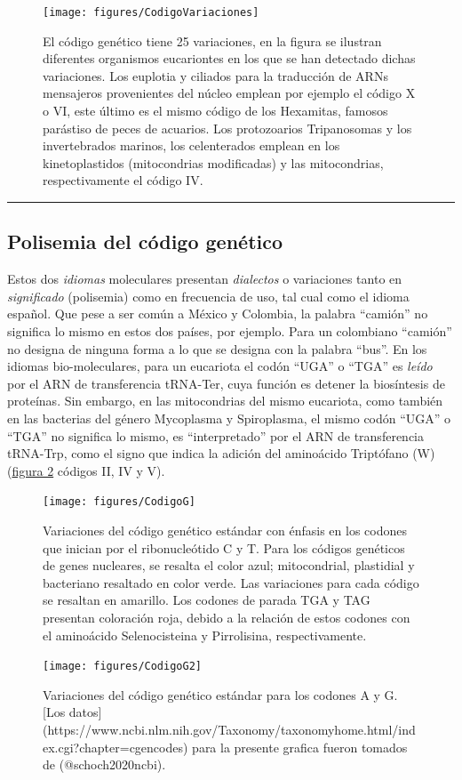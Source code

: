 \documentclass[
  12pt, krantz2,
  spanish,
]{krantz}
\begin{document}
\begin{figure}
\texttt{[image: figures/CodigoVariaciones]} \caption{El código genético tiene 25 variaciones, en la figura se ilustran diferentes organismos eucariontes en los que se han detectado dichas variaciones. Los euplotia y ciliados para la traducción de ARNs mensajeros provenientes del núcleo emplean por ejemplo el código X o VI, este último es el mismo código de los Hexamitas, famosos parástiso de peces de acuarios. Los protozoarios Tripanosomas y los invertebrados marinos, los celenterados emplean en los kinetoplastidos (mitocondrias modificadas) y las mitocondrias, respectivamente el código IV.}\label{fig:excepciones}
\end{figure}

\begin{center}\rule{0.5\linewidth}{0.5pt}\end{center}

\hypertarget{polisemia-del-cuxf3digo-genuxe9tico}{%
\subsection{Polisemia del código genético}\label{polisemia-del-cuxf3digo-genuxe9tico}}

Estos dos \emph{idiomas} moleculares presentan \emph{dialectos} o variaciones tanto en \emph{significado} (polisemia) como en frecuencia de uso, tal cual como el idioma español. Que pese a ser común a México y Colombia, la palabra ``camión'' no significa lo mismo en estos dos países, por ejemplo. Para un colombiano ``camión'' no designa de ninguna forma a lo que se designa con la palabra ``bus''. En los idiomas bio-moleculares, para un eucariota el codón ``UGA'' o ``TGA'' es \emph{leído} por el ARN de transferencia tRNA-Ter, cuya función es detener la biosíntesis de proteínas. Sin embargo, en las mitocondrias del mismo eucariota, como también en las bacterias del género Mycoplasma y Spiroplasma, el mismo codón ``UGA'' o ``TGA'' no significa lo mismo, es ``interpretado'' por el ARN de transferencia tRNA-Trp, como el signo que indica la adición del aminoácido Triptófano (W) (\href{variaciones1}{figura 2} códigos II, IV y V).

\begin{figure}
\texttt{[image: figures/CodigoG]} \caption{Variaciones del código genético estándar con énfasis en los codones que inician por el ribonucleótido C y T. Para los códigos genéticos de genes nucleares, se resalta el color azul; mitocondrial, plastidial y bacteriano resaltado en color verde. Las variaciones para cada código se resaltan en amarillo. Los codones de parada TGA y TAG  presentan coloración roja, debido a la relación de estos codones con el aminoácido Selenocisteina y Pirrolisina, respectivamente.}\label{fig:variaciones1-1}
\end{figure}
\begin{figure}
\texttt{[image: figures/CodigoG2]} \caption{Variaciones del código genético estándar para los codones A y G. [Los datos](https://www.ncbi.nlm.nih.gov/Taxonomy/taxonomyhome.html/index.cgi?chapter=cgencodes) para la presente grafica fueron tomados de (@schoch2020ncbi).}\label{fig:variaciones1-2}
\end{figure}
\end{document}
